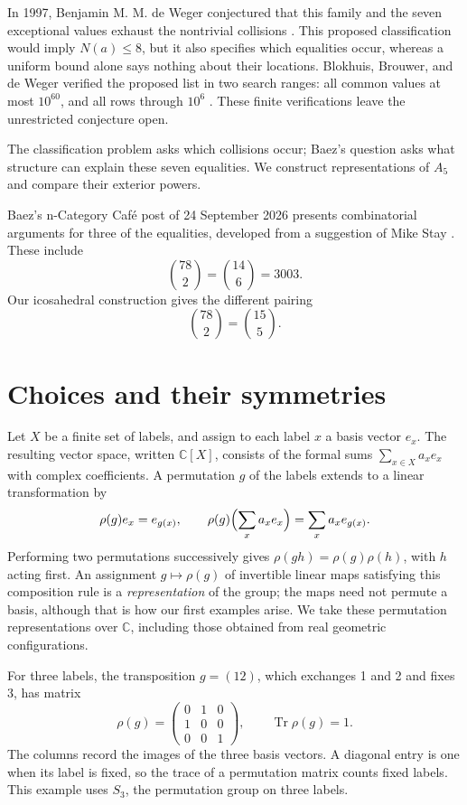 \documentclass[11pt,a4paper]{article}
\begin{document}
In 1997, Benjamin M. M. de Weger conjectured that this family and the seven exceptional values exhaust the nontrivial collisions \citep[Conjecture A]{deWeger1997}. This proposed classification would imply \(N(a)\leq8\), but it also specifies which equalities occur, whereas a uniform bound alone says nothing about their locations. Blokhuis, Brouwer, and de Weger verified the proposed list in two search ranges: all common values at most \(10^{60}\), and all rows through \(10^6\) \citep[Theorem 1]{BlokhuisBrouwerdeWeger2017}. These finite verifications leave the unrestricted conjecture open.

The classification problem asks which collisions occur; Baez's question asks what structure can explain these seven equalities. We construct representations of $A_5$ and compare their exterior powers.

Baez's n-Category Caf\'e post of 24 September 2026 presents combinatorial arguments for three of the equalities, developed from a suggestion of Mike Stay \citep{Baez2026Cafe}. These include
\[
\binom{78}{2}=\binom{14}{6}=3003.
\]
Our icosahedral construction gives the different pairing
\[
\binom{78}{2}=\binom{15}{5}.
\]

\FloatBarrier
\section{Choices and their symmetries}\label{sec:choices}

Let \(X\) be a finite set of labels, and assign to each label \(x\) a basis vector \(e_x\). The resulting vector space, written \(\mathbb C[X]\), consists of the formal sums \(\sum_{x\in X}a_xe_x\) with complex coefficients. A permutation \(g\) of the labels extends to a linear transformation by
\[
\rho(g)e_x=e_{g(x)},\qquad
\rho(g)\Bigl(\sum_x a_xe_x\Bigr)=\sum_x a_xe_{g(x)}.
\]
Performing two permutations successively gives \(\rho(gh)=\rho(g)\rho(h)\), with \(h\) acting first. An assignment $g\mapsto\rho(g)$ of invertible linear maps satisfying this composition rule is a \emph{representation} of the group; the maps need not permute a basis, although that is how our first examples arise. We take these permutation representations over \(\mathbb C\), including those obtained from real geometric configurations.

For three labels, the transposition \(g=(12)\), which exchanges 1 and 2 and fixes 3, has matrix
\[
\rho(g)=\begin{pmatrix}0&1&0\\1&0&0\\0&0&1\end{pmatrix},
\qquad \operatorname{Tr}\rho(g)=1.
\]
The columns record the images of the three basis vectors. A diagonal entry is one when its label is fixed, so the trace of a permutation matrix counts fixed labels. This example uses $S_3$, the permutation group on three labels.
\end{document}
